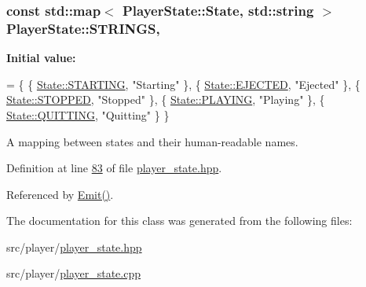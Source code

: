 \hypertarget{classPlayerState_af9cd9cd0e2d4c24e59ea11d35bdaff78}{
\subsubsection[{S\+T\+R\+I\+N\+G\+S}]{\setlength{\rightskip}{0pt plus 5cm}const std\+::map$<$ {\bf Player\+State\+::\+State}, std\+::string $>$ Player\+State\+::\+S\+T\+R\+I\+N\+G\+S\hspace{0.3cm}{\ttfamily [static]}, {\ttfamily [private]}}}\label{classPlayerState_af9cd9cd0e2d4c24e59ea11d35bdaff78}
{\bfseries Initial value\+:}
\begin{DoxyCode}
= \{
    \{ \hyperlink{classPlayerState_ab013f68ff23d69d677faae624b5dff07a034312d8adc8099c1c6f53aaff745e26}{State::STARTING}, \textcolor{stringliteral}{"Starting"} \},
    \{ \hyperlink{classPlayerState_ab013f68ff23d69d677faae624b5dff07a209d5541434371bb6b79dc8cca8fa55b}{State::EJECTED}, \textcolor{stringliteral}{"Ejected"} \},
    \{ \hyperlink{classPlayerState_ab013f68ff23d69d677faae624b5dff07a09d4d696b4e935115b9313e3c412509a}{State::STOPPED}, \textcolor{stringliteral}{"Stopped"} \},
    \{ \hyperlink{classPlayerState_ab013f68ff23d69d677faae624b5dff07a50366a49630a416ab3ccaa004196027e}{State::PLAYING}, \textcolor{stringliteral}{"Playing"} \},
    \{ \hyperlink{classPlayerState_ab013f68ff23d69d677faae624b5dff07a4eb3979af877a3c13830cd69c746e230}{State::QUITTING}, \textcolor{stringliteral}{"Quitting"} \}
\}
\end{DoxyCode}


A mapping between states and their human-\/readable names. 



Definition at line \hyperlink{player__state_8hpp_source_l00083}{83} of file \hyperlink{player__state_8hpp_source}{player\+\_\+state.\+hpp}.



Referenced by \hyperlink{player__state_8cpp_source_l00052}{Emit()}.



The documentation for this class was generated from the following files\+:\begin{DoxyCompactItemize}
\item 
src/player/\hyperlink{player__state_8hpp}{player\+\_\+state.\+hpp}\item 
src/player/\hyperlink{player__state_8cpp}{player\+\_\+state.\+cpp}\end{DoxyCompactItemize}
